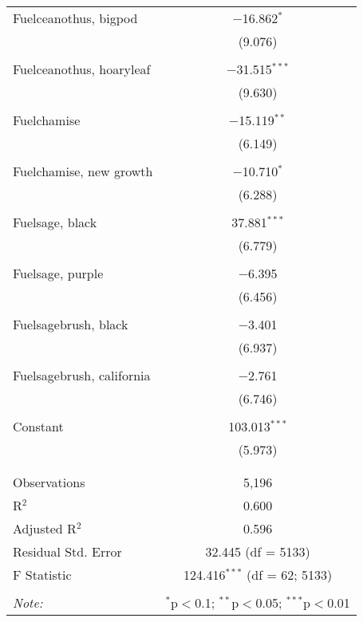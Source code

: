 \begin{table}[!htbp]
\begin{tabular}{@{\extracolsep{5pt}}lc}
 Fuelceanothus, bigpod & $-$16.862$^{*}$ \\ 
  & (9.076) \\ 
  & \\ 
 Fuelceanothus, hoaryleaf & $-$31.515$^{***}$ \\ 
  & (9.630) \\ 
  & \\ 
 Fuelchamise & $-$15.119$^{**}$ \\ 
  & (6.149) \\ 
  & \\ 
 Fuelchamise, new growth & $-$10.710$^{*}$ \\ 
  & (6.288) \\ 
  & \\ 
 Fuelsage, black & 37.881$^{***}$ \\ 
  & (6.779) \\ 
  & \\ 
 Fuelsage, purple & $-$6.395 \\ 
  & (6.456) \\ 
  & \\ 
 Fuelsagebrush, black & $-$3.401 \\ 
  & (6.937) \\ 
  & \\ 
 Fuelsagebrush, california & $-$2.761 \\ 
  & (6.746) \\ 
  & \\ 
 Constant & 103.013$^{***}$ \\ 
  & (5.973) \\ 
  & \\ 
\hline \\[-1.8ex] 
Observations & 5,196 \\ 
R$^{2}$ & 0.600 \\ 
Adjusted R$^{2}$ & 0.596 \\ 
Residual Std. Error & 32.445 (df = 5133) \\ 
F Statistic & 124.416$^{***}$ (df = 62; 5133) \\ 
\hline 
\hline \\[-1.8ex] 
\textit{Note:}  & \multicolumn{1}{r}{$^{*}$p$<$0.1; $^{**}$p$<$0.05; $^{***}$p$<$0.01} \\ 
\end{tabular} 
\end{table} 
